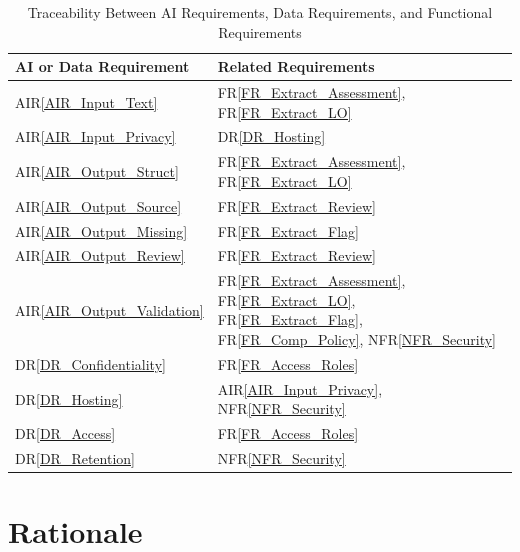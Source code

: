 \documentclass[12pt]{article}
\newcommand{\rref}[1]{FR\ref{#1}}
\newcommand{\nfrref}[1]{NFR\ref{#1}}
\newcommand{\drref}[1]{DR\ref{#1}}
\newcommand{\airref}[1]{AIR\ref{#1}}
\begin{document}
\begin{table}[H]
\centering
\small
\renewcommand{\arraystretch}{1.2}
\begin{tabular}{>{\raggedright\arraybackslash}p{} >{\raggedright\arraybackslash}p{}}
\toprule
\textbf{AI or Data Requirement} & \textbf{Related Requirements} \\
\midrule
\airref{AIR_Input_Text} & \rref{FR_Extract_Assessment}, \rref{FR_Extract_LO} \\
\airref{AIR_Input_Privacy} & \drref{DR_Hosting} \\
\airref{AIR_Output_Struct} & \rref{FR_Extract_Assessment}, \rref{FR_Extract_LO} \\
\airref{AIR_Output_Source} & \rref{FR_Extract_Review} \\
\airref{AIR_Output_Missing} & \rref{FR_Extract_Flag} \\
\airref{AIR_Output_Review} & \rref{FR_Extract_Review} \\
\airref{AIR_Output_Validation} & \rref{FR_Extract_Assessment}, \rref{FR_Extract_LO}, \rref{FR_Extract_Flag}, \rref{FR_Comp_Policy}, \nfrref{NFR_Security} \\
\drref{DR_Confidentiality} & \rref{FR_Access_Roles} \\
\drref{DR_Hosting} & \airref{AIR_Input_Privacy}, \nfrref{NFR_Security} \\
\drref{DR_Access} & \rref{FR_Access_Roles} \\
\drref{DR_Retention} & \nfrref{NFR_Security} \\
\bottomrule
\end{tabular}
\caption{Traceability Between AI Requirements, Data Requirements, and Functional
Requirements} \label{tab:AIR2Reqtm}
\end{table}


\section{Rationale}

\end{document}

